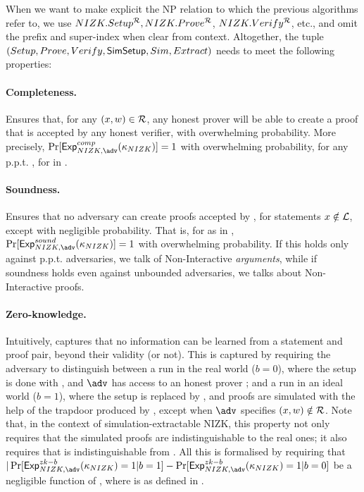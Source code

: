 When we want to make explicit the NP relation \NIZKRel to which the previous
algorithms refer to, we use $NIZK.Setup^\mathcal{R},NIZK.Prove^\mathcal{R}$, 
$NIZK.Verify^\mathcal{R}$, etc., and omit the \NIZK prefix and super-index when
clear from context. Altogether, the tuple $(Setup,Prove,Verify,\mathsf{SimSetup},
Sim,Extract)$ needs to meet the following properties:

\paragraph{Completeness.} %
Ensures that, for any $(x,w) \in \mathcal{R}$, any honest prover will be
able to create a proof \NIZKproof that is accepted by any honest verifier, with
overwhelming probability. More precisely, $\Pr\lbrack\ExpNIZKComp(\NIZKsecpar)
\rbrack = 1$ with overwhelming probability, for any p.p.t. \adv, for
\ExpNIZKComp in .

\paragraph{Soundness.} %
Ensures that no adversary can create proofs accepted by \Verify, for
statements $x \notin \mathcal{L}$, except with negligible probability. That
is, for \ExpNIZKSound as in , $\Pr\lbrack\ExpNIZKSound
(\NIZKsecpar)\rbrack=1$ with overwhelming probability. If this holds only
against p.p.t. adversaries, we talk of Non-Interactive \emph{arguments}, while
if soundness holds even against unbounded adversaries, we talks about
Non-Interactive proofs.

\paragraph{Zero-knowledge.} %
Intuitively, captures that no information can be learned from a statement and
proof pair, beyond their validity (or not). This is captured by requiring the
adversary to distinguish between a run in the real world ($b=0$), where the
setup is done with \Setup, and $\adv$ has access to an honest prover
\Prove; and a run in an ideal world ($b=1$), where the setup is replaced by
\SimSetup, and proofs are simulated with the help of the trapdoor produced by
\SimSetup, except when $\adv$ specifies $(x,w) \notin \mathcal{R}$. Note
that, in the context of simulation-extractable NIZK, this property not only
requires that the simulated proofs are indistinguishable to the real ones; it
also requires that \SimSetup is indistinguishable from \Setup. All this is
formalised by requiring that $|\Pr[\ExpNIZKZKb(\NIZKsecpar) = 1 | b = 1] -
\Pr[\ExpNIZKZKb(\NIZKsecpar) = 1 | b = 0]$ be a negligible function of \secpar,
where \ExpNIZKZKb is as defined in .

